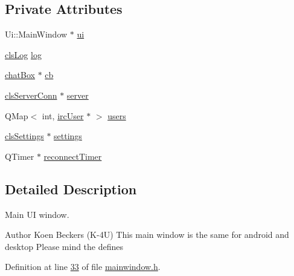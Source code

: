 \subsection*{Private Attributes}
\begin{DoxyCompactItemize}
\item 
Ui\-::\-Main\-Window $\ast$ \hyperlink{classclient_1_1_main_window_a2ec3641144030d30cd5358d33576c06c}{ui}
\item 
\hyperlink{class_k4_u_1_1cls_log}{cls\-Log} \hyperlink{classclient_1_1_main_window_ad83b542f504d4d017661c0aa7ce630b7}{log}
\item 
\hyperlink{classclient_1_1chat_box}{chat\-Box} $\ast$ \hyperlink{classclient_1_1_main_window_aa1e651adf78ed0a72d8c028a8263e17d}{cb}
\item 
\hyperlink{classclient_1_1cls_server_conn}{cls\-Server\-Conn} $\ast$ \hyperlink{classclient_1_1_main_window_a4766f55e461fd529caa84bf953e5151c}{server}
\item 
Q\-Map$<$ int, \hyperlink{classclient_1_1irc_user}{irc\-User} $\ast$ $>$ \hyperlink{classclient_1_1_main_window_a1b6893fbe6201f0ab9d6e94695834bb5}{users}
\item 
\hyperlink{classclient_1_1cls_settings}{cls\-Settings} $\ast$ \hyperlink{classclient_1_1_main_window_a2ae4ecf491386322fd60aee80ba9f9c7}{settings}
\item 
Q\-Timer $\ast$ \hyperlink{classclient_1_1_main_window_a5ee3a3827379da6df9f7e0348fa9d91d}{reconnect\-Timer}
\end{DoxyCompactItemize}


\subsection{Detailed Description}
Main U\-I window. 

\begin{DoxyAuthor}{Author}
Koen Beckers (K-\/4\-U) This main window is the same for android and desktop Please mind the defines 
\end{DoxyAuthor}


Definition at line \hyperlink{mainwindow_8h_source_l00033}{33} of file \hyperlink{mainwindow_8h_source}{mainwindow.\-h}.



